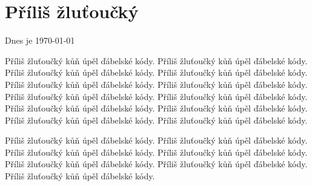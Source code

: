 \documentclass[12pt,a4paper]{article}
\begin{document}
\section{Příliš žluťoučký}
Dnes je \today

Příliš žluťoučký kůň úpěl ďábelské kódy.
Příliš žluťoučký kůň úpěl ďábelské kódy.
Příliš žluťoučký kůň úpěl ďábelské kódy.
Příliš žluťoučký kůň úpěl ďábelské kódy.
Příliš žluťoučký kůň úpěl ďábelské kódy.
Příliš žluťoučký kůň úpěl ďábelské kódy.
Příliš žluťoučký kůň úpěl ďábelské kódy.
Příliš žluťoučký kůň úpěl ďábelské kódy.
Příliš žluťoučký kůň úpěl ďábelské kódy.
Příliš žluťoučký kůň úpěl ďábelské kódy.
Příliš žluťoučký kůň úpěl ďábelské kódy.
Příliš žluťoučký kůň úpěl ďábelské kódy.

Příliš žluťoučký kůň úpěl ďábelské kódy.
Příliš žluťoučký kůň úpěl ďábelské kódy.
Příliš žluťoučký kůň úpěl ďábelské kódy.
Příliš žluťoučký kůň úpěl ďábelské kódy.
Příliš žluťoučký kůň úpěl ďábelské kódy.
Příliš žluťoučký kůň úpěl ďábelské kódy.
Příliš žluťoučký kůň úpěl ďábelské kódy.
\end{document}
